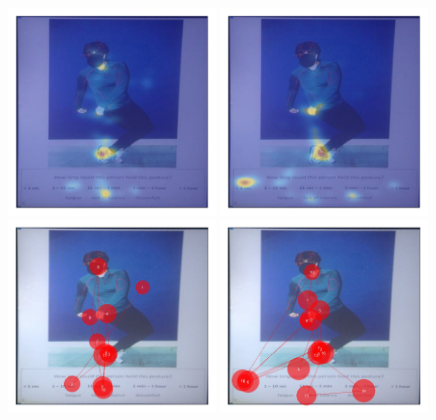 \documentclass[11pt]{asaproc}
\begin{document}
\begin{figure}[t]
\begin{center} 
\includegraphics[width=0.49\textwidth]{figures/Kayd_heatmap_posture8.jpg} \hspace{1pt}
\includegraphics[width=0.49\textwidth]{figures/Subject13_heatmap_posture8.jpg} \\
\includegraphics[width=0.49\textwidth]{figures/Kayd_scanpath_posture8.jpg} \hspace{1pt}
\includegraphics[width=0.49\textwidth]{figures/Subject13_scanpath_posture8.jpg}

\end{center}
\end{figure}
\end{document}
